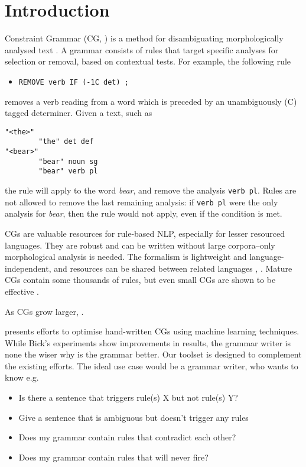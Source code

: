 \section{Introduction}
\label{sec:intro}

Constraint Grammar (CG, \cite{karlsson1995constraint})
is a method for disambiguating morphologically analysed text%
. 
A grammar consists of rules that target specific analyses for selection or removal, based on contextual tests. For example, the following rule
\begin{itemize}
\item[] \texttt{REMOVE verb IF (-1C det) ;}
\end{itemize}
removes a verb reading from a word which is preceded by an unambiguously (C) tagged determiner.
Given a text, such as

\begin{verbatim}
"<the>"
        "the" det def
"<bear>"
        "bear" noun sg
        "bear" verb pl
\end{verbatim}

the rule will apply to the word \emph{bear}, and remove the analysis \texttt{verb pl}.
Rules are not allowed to remove the last remaining analysis: if  \texttt{verb pl} were the only analysis for \emph{bear}, then the rule would not apply, even if the condition is met.

CGs are valuable resources for rule-based NLP, especially for lesser resourced languages. They are robust and can be written without large corpora--only morphological analysis is needed. The formalism is lightweight and language-independent, and resources can be shared between related languages \cite{bick2006spanish}, \cite{lene_trond_linda2010}.
Mature CGs contain some thousands of rules, but even small CGs are shown to be effective \cite{lene_trond2011}.

As CGs grow larger, .

\cite{bick2013tuning} presents efforts to optimise hand-written CGs using machine learning techniques.
While Bick's experiments show improvements in results, the grammar writer is none the wiser why is the grammar better.
Our toolset is designed to complement the existing efforts.
The ideal use case would be a grammar writer, who wants to know e.g.

\begin{itemize}
\item Is there a sentence that triggers rule(s) X but not rule(s) Y?
\item Give a sentence that is ambiguous but doesn't trigger any rules
\item Does my grammar contain rules that contradict each other?
\item Does my grammar contain rules that will never fire?
\end{itemize}

